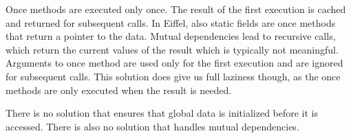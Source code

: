 \begin{mytitle} Once methods are executed only once. The result of the first execution is cached and returned for subsequent calls. In Eiffel, also static fields are once methods that return a pointer to the data. Mutual dependencies lead to recursive calls, which return the current values of the result which is typically not meaningful. Arguments to once method are used only for the first execution and are ignored for subsequent calls. This solution does give us full laziness though, as the once methods are only executed when the result is needed.
\end{mytitle}
\begin{mytitle}[Summary] There is no solution that ensures that global data is initialized before it is accessed. There is also no solution that handles mutual dependencies.
\end{mytitle}